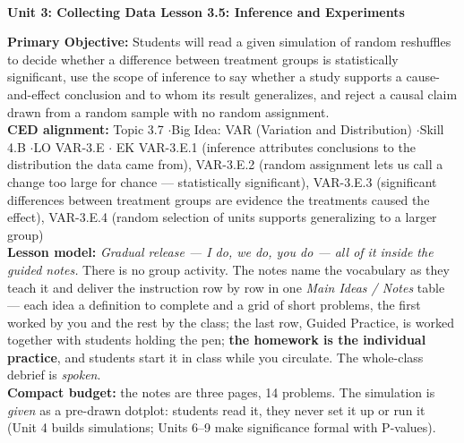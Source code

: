 \documentclass[10pt]{article}
\newcommand{\UnitNumberName}{Unit 3: Collecting Data \quad}
\newcommand{\LessonNumberName}{Lesson 3.5: Inference and Experiments}
\begin{document}
\begin{center}
    {\Large\bfseries \CourseName \\
    {\small\bfseries \UnitNumberName \LessonNumberName}}
\end{center}

\begin{tcolorbox}[colback=sky, colframe=navy, boxrule=0.9pt, arc=2mm,
    left=2mm, right=2mm, top=1.5mm, bottom=1.5mm]
    \textbf{Primary Objective:} Students will read a given simulation of random reshuffles to
    decide whether a difference between treatment groups is statistically significant, use the
    scope of inference to say whether a study supports a cause-and-effect conclusion and to
    whom its result generalizes, and reject a causal claim drawn from a random sample with no
    random assignment.
    \\[2pt]
    \textbf{CED alignment:} Topic 3.7 \quad$\cdot$\quad Big Idea: VAR (Variation and
    Distribution) \quad$\cdot$\quad Skill 4.B \quad$\cdot$\quad LO VAR-3.E \quad$\cdot$\quad
    EK VAR-3.E.1 (inference attributes conclusions to the distribution the data came from),
    VAR-3.E.2 (random assignment lets us call a change too large for chance --- statistically
    significant), VAR-3.E.3 (significant differences between treatment groups are evidence
    the treatments caused the effect), VAR-3.E.4 (random selection of units supports
    generalizing to a larger group)
    \\[2pt]
    \textbf{Lesson model:} \emph{Gradual release --- I do, we do, you do --- all of it inside
    the guided notes.} There is no group activity. The notes name the vocabulary as they teach
    it and deliver the instruction row by row in one \emph{Main Ideas / Notes} table --- each
    idea a definition to complete and a grid of short problems, the first worked by you and the
    rest by the class; the last row, Guided Practice, is worked together with students holding
    the pen; \textbf{the homework is the individual practice}, and students start it in class
    while you circulate. The whole-class debrief is \emph{spoken}.
    \\[2pt]
    \textbf{Compact budget:} the notes are three pages, 14 problems. The simulation is
    \emph{given} as a pre-drawn dotplot: students read it, they never set it up or run it
    (Unit 4 builds simulations; Units 6--9 make significance formal with P-values).
\end{tcolorbox}
\end{document}
